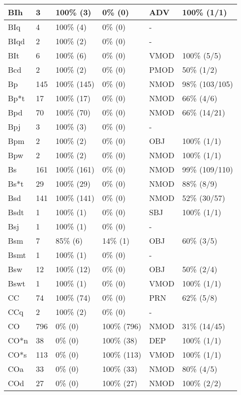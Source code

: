 \begin{figure*}
\begin{tabular}{|l|l|l|l||l|l|}
 BIh & 3 & 100\% (3) & 0\% (0) & ADV & 100\% (1/1) \\ 
\hline
 BIq & 4 & 100\% (4) & 0\% (0) & - &  \\ 
\hline
 BIqd & 2 & 100\% (2) & 0\% (0) & - &  \\ 
\hline
 BIt & 6 & 100\% (6) & 0\% (0) & VMOD & 100\% (5/5) \\ 
\hline
 Bcd & 2 & 100\% (2) & 0\% (0) & PMOD & 50\% (1/2) \\ 
\hline
 Bp & 145 & 100\% (145) & 0\% (0) & NMOD & 98\% (103/105) \\ 
\hline
 Bp*t & 17 & 100\% (17) & 0\% (0) & NMOD & 66\% (4/6) \\ 
\hline
 Bpd & 70 & 100\% (70) & 0\% (0) & NMOD & 66\% (14/21) \\ 
\hline
 Bpj & 3 & 100\% (3) & 0\% (0) & - &  \\ 
\hline
 Bpm & 2 & 100\% (2) & 0\% (0) & OBJ & 100\% (1/1) \\ 
\hline
 Bpw & 2 & 100\% (2) & 0\% (0) & NMOD & 100\% (1/1) \\ 
\hline
 Bs & 161 & 100\% (161) & 0\% (0) & NMOD & 99\% (109/110) \\ 
\hline
 Bs*t & 29 & 100\% (29) & 0\% (0) & NMOD & 88\% (8/9) \\ 
\hline
 Bsd & 141 & 100\% (141) & 0\% (0) & NMOD & 52\% (30/57) \\ 
\hline
 Bsdt & 1 & 100\% (1) & 0\% (0) & SBJ & 100\% (1/1) \\ 
\hline
 Bsj & 1 & 100\% (1) & 0\% (0) & - &  \\ 
\hline
 Bsm & 7 & 85\% (6) & 14\% (1) & OBJ & 60\% (3/5) \\ 
\hline
 Bsmt & 1 & 100\% (1) & 0\% (0) & - &  \\ 
\hline
 Bsw & 12 & 100\% (12) & 0\% (0) & OBJ & 50\% (2/4) \\ 
\hline
 Bswt & 1 & 100\% (1) & 0\% (0) & VMOD & 100\% (1/1) \\ 
\hline
 CC & 74 & 100\% (74) & 0\% (0) & PRN & 62\% (5/8) \\ 
\hline
 CCq & 2 & 100\% (2) & 0\% (0) & - &  \\ 
\hline
 CO & 796 & 0\% (0) & 100\% (796) & NMOD & 31\% (14/45) \\ 
\hline
 CO*n & 38 & 0\% (0) & 100\% (38) & DEP & 100\% (1/1) \\ 
\hline
 CO*s & 113 & 0\% (0) & 100\% (113) & VMOD & 100\% (1/1) \\ 
\hline
 COa & 33 & 0\% (0) & 100\% (33) & NMOD & 80\% (4/5) \\ 
\hline
 COd & 27 & 0\% (0) & 100\% (27) & NMOD & 100\% (2/2) \\ 
\hline
\end{tabular}
\end{figure*}
